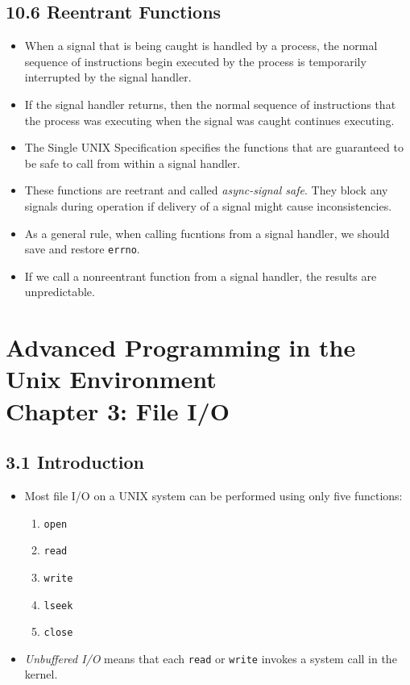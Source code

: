 \documentclass[]{article}
\newcommand{\code}{\texttt}
\begin{document}
\subsection*{10.6 Reentrant Functions}
\begin{itemize}
\item When a signal that is being caught is handled by a process, the normal
sequence of instructions begin executed by the process is temporarily
interrupted by the signal handler.
\item If the signal handler returns, then the normal sequence of instructions
that the process was executing when the signal was caught continues executing.
\item The Single UNIX Specification specifies the functions that are guaranteed
to be safe to call from within a signal handler.
\item These functions are reetrant and called \emph{async-signal safe}. They
block any signals during operation if delivery of a signal might cause
inconsistencies.
\item As a general rule, when calling fucntions from a signal handler, we should
save and restore \code{errno}.
\item If we call a nonreentrant function from a signal handler, the results are
unpredictable.
\end{itemize}

\section*{Advanced Programming in the Unix Environment \\
Chapter 3: File I/O}
\subsection*{3.1 Introduction}
\begin{itemize}
\item Most file I/O on a UNIX system can be performed using only five functions:
\begin{enumerate}
\item \code{open}
\item \code{read}
\item \code{write}
\item \code{lseek}
\item \code{close}
\end{enumerate}
\item \emph{Unbuffered I/O} means that each \code{read} or \code{write} invokes
a system call in the kernel.
\end{itemize}
\end{document}
